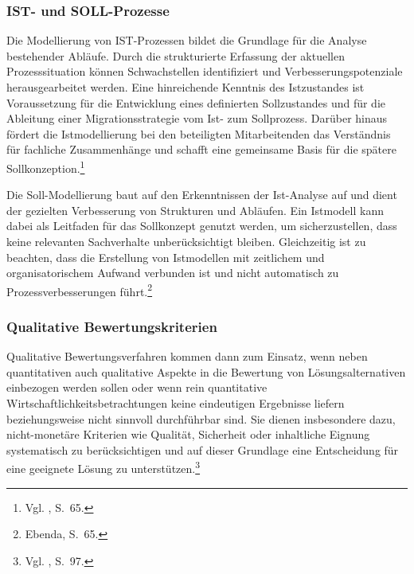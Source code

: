 \documentclass[
    12pt, 
    a4paper,
    ]{scrartcl} %
\begin{document}
\subsubsection{IST- und SOLL-Prozesse}
Die Modellierung von IST-Prozessen bildet die Grundlage für die Analyse bestehender Abläufe. Durch die strukturierte Erfassung der aktuellen Prozesssituation können Schwachstellen identifiziert und Verbesserungspotenziale herausgearbeitet werden. Eine hinreichende Kenntnis des Istzustandes ist Voraussetzung für die Entwicklung eines definierten Sollzustandes und für die Ableitung einer Migrationsstrategie vom Ist- zum Sollprozess. Darüber hinaus fördert die Istmodellierung bei den beteiligten Mitarbeitenden das Verständnis für fachliche Zusammenhänge und schafft eine gemeinsame Basis für die spätere Sollkonzeption.\footnote{Vgl. \cite{Koch_Geschaeftsprozessmanagement}, S.~65.} 

Die Soll-Modellierung baut auf den Erkenntnissen der Ist-Analyse auf und dient der gezielten Verbesserung von Strukturen und Abläufen. Ein Istmodell kann dabei als Leitfaden für das Sollkonzept genutzt werden, um sicherzustellen, dass keine relevanten Sachverhalte unberücksichtigt bleiben. Gleichzeitig ist zu beachten, dass die Erstellung von Istmodellen mit zeitlichem und organisatorischem Aufwand verbunden ist und nicht automatisch zu Prozessverbesserungen führt.\footnote{Ebenda, S.~65.}

\subsubsection{Qualitative Bewertungskriterien}
Qualitative Bewertungsverfahren kommen dann zum Einsatz, wenn neben quantitativen auch qualitative Aspekte in die Bewertung von Lösungsalternativen einbezogen werden sollen oder wenn rein quantitative Wirtschaftlichkeitsbetrachtungen keine eindeutigen Ergebnisse liefern beziehungsweise nicht sinnvoll durchführbar sind. Sie dienen insbesondere dazu, nicht-monetäre Kriterien wie Qualität, Sicherheit oder inhaltliche Eignung systematisch zu berücksichtigen und auf dieser Grundlage eine Entscheidung für eine geeignete Lösung zu unterstützen.\footnote{Vgl. \cite{Koch_Geschaeftsprozessmanagement}, S.~97.} 
\end{document}
